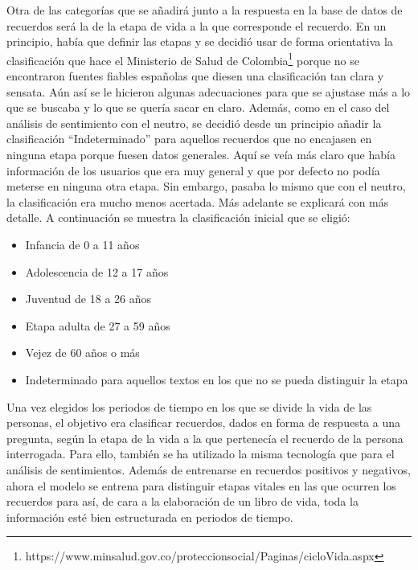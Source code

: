 Otra de las categorías que se añadirá junto a la respuesta en la base de datos de recuerdos será la de la etapa de vida a la que corresponde el recuerdo. En un principio, había que definir las etapas y se decidió usar de forma orientativa la clasificación que hace el Ministerio de Salud de Colombia\footnote{https://www.minsalud.gov.co/proteccionsocial/Paginas/cicloVida.aspx} porque no se encontraron fuentes fiables españolas que diesen una clasificación tan clara y sensata. Aún así se le hicieron algunas adecuaciones para que se ajustase más a lo que se buscaba y lo que se quería sacar en claro. Además, como en el caso del análisis de sentimiento con el neutro, se decidió desde un principio añadir la clasificación ``Indeterminado'' para aquellos recuerdos que no encajasen en ninguna etapa porque fuesen datos generales. Aquí se veía más claro que había información de los usuarios que era muy general y que por defecto no podía meterse en ninguna otra etapa. Sin embargo, pasaba lo mismo que con el neutro, la clasificación era mucho menos acertada. Más adelante se explicará con más detalle. A continuación se muestra la clasificación inicial que se eligió:

\begin{itemize}
	\item Infancia de 0 a 11 años
	\item Adolescencia de 12 a 17 años
	\item Juventud de 18 a 26 años
	\item Etapa adulta de 27 a 59 años
	\item Vejez de 60 años o más
	\item Indeterminado para aquellos textos en los que no se pueda distinguir la etapa
\end{itemize}

Una vez elegidos los periodos de tiempo en los que se divide la vida de las personas, el objetivo era clasificar recuerdos, dados en forma de respuesta a una pregunta, según la etapa de la vida a la que pertenecía el recuerdo de la persona interrogada. Para ello, también se ha utilizado la misma tecnología que para el análisis de sentimientos. Además de entrenarse en recuerdos positivos y negativos, ahora el modelo se entrena para distinguir etapas vitales en las que ocurren los recuerdos para así, de cara a la elaboración de un libro de vida, toda la información esté bien estructurada en periodos de tiempo. 


